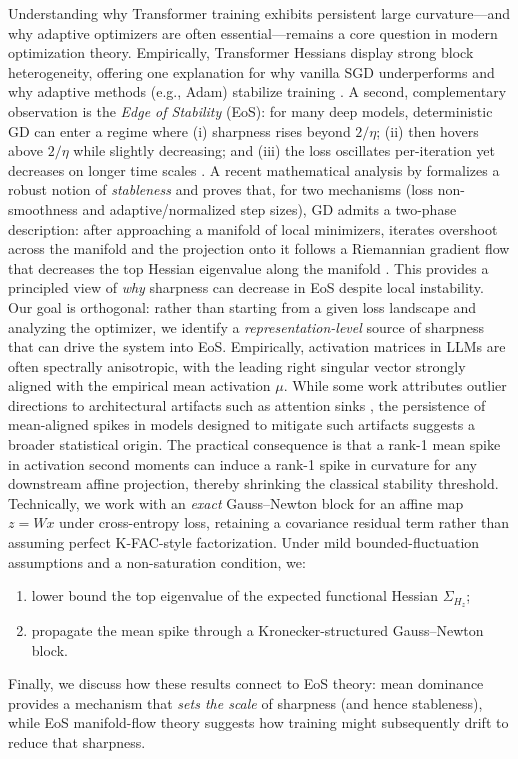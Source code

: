 \documentclass[11pt]{article}
\begin{document}
Understanding why Transformer training exhibits persistent large curvature---and why adaptive optimizers are often essential---remains a core question in modern optimization theory.
Empirically, Transformer Hessians display strong block heterogeneity, offering one explanation for why vanilla SGD underperforms and why adaptive methods (e.g., Adam) stabilize training \citep{zhang2024why}.
A second, complementary observation is the \emph{Edge of Stability} (EoS): for many deep models, deterministic GD can enter a regime where (i) sharpness rises beyond $2/\eta$;
(ii) then hovers above $2/\eta$ while slightly decreasing; and (iii) the loss oscillates per-iteration yet decreases on longer time scales \citep{cohen2021gradient}.
A recent mathematical analysis by \citet{arora2022understanding} formalizes a robust notion of \emph{stableness} and proves that, for two mechanisms (loss non-smoothness and adaptive/normalized step sizes), GD admits a two-phase description: after approaching a manifold of local minimizers, iterates overshoot across the manifold and the projection onto it follows a Riemannian gradient flow that decreases the top Hessian eigenvalue along the manifold \citep{arora2022understanding}.
This provides a principled view of \emph{why} sharpness can decrease in EoS despite local instability.
Our goal is orthogonal: rather than starting from a given loss landscape and analyzing the optimizer, we identify a \emph{representation-level} source of sharpness that can drive the system into EoS.
Empirically, activation matrices in LLMs are often spectrally anisotropic, with the leading right singular vector strongly aligned with the empirical mean activation $\mu$.
While some work attributes outlier directions to architectural artifacts such as attention sinks \citep{xiao2023efficient}, the persistence of mean-aligned spikes in models designed to mitigate such artifacts suggests a broader statistical origin.
The practical consequence is that a rank-1 mean spike in activation second moments can induce a rank-1 spike in curvature for any downstream affine projection, thereby shrinking the classical stability threshold.
Technically, we work with an \emph{exact} Gauss--Newton block for an affine map $z=Wx$ under cross-entropy loss, retaining a covariance residual term rather than assuming perfect K-FAC-style factorization.
Under mild bounded-fluctuation assumptions and a non-saturation condition, we:
\begin{enumerate}
  \item lower bound the top eigenvalue of the expected functional Hessian $\Sigma_{H_z}$;
  \item propagate the mean spike through a Kronecker-structured Gauss--Newton block.
\end{enumerate}
Finally, we discuss how these results connect to EoS theory: mean dominance provides a mechanism that \emph{sets the scale} of sharpness (and hence stableness), while EoS manifold-flow theory suggests how training might subsequently drift to reduce that sharpness.
\end{document}

